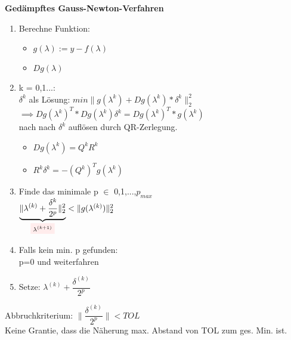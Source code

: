 \documentclass[../ZF_HM2.tex]{subfiles}
\begin{document}
\begin{mdframed}
	\textbf{Gedämpftes Gauss-Newton-Verfahren}
	\begin{enumerate}
		\item Berechne Funktion:
		\begin{itemize}
			\item  $g(\lambda):= y-f(\lambda)$
			\item $Dg(\lambda)$
			\end{itemize}
		\item k = 0,1...:\\ $\delta^{k}$ als Lösung: $min\|g(\lambda^{k})+Dg(\lambda^{k})*\delta^{k}\|_2^{2}$\\
		$\implies Dg(\lambda^{k})^{T}*Dg(\lambda^{k})\delta^{k} = Dg(\lambda^{k})^{T}*g(\lambda^{k})$\\
		nach \colorbox{pink!30}{nach $\delta^{k}$ auflösen} durch QR-Zerlegung.
		\begin{itemize}
			\item \colorbox{pink!30}{$Dg(\lambda^{k})=Q^{k}R^{k}$}
			\item \colorbox{pink!30}{$R^{k}\delta^{k}=-(Q^{k})^{T}g(\lambda^{k})$}
		\end{itemize}
		\item Finde das minimale p $\in$ {0,1,...,$p_{max}$}\\ $\underbrace{\|\lambda^{(k)}+\dfrac{\delta^{k}}{2^{p}}\|_2^{2}}_\text{\colorbox{pink!30}{$\lambda^{(k+1)}$}}<\|g(\lambda^{(k)})\|_2^{2}$\\
		\item Falls kein min. p gefunden:\\
		p=0 und weiterfahren
		\item Setze: $\lambda^{(k)}+\dfrac{\delta^{(k)}}{2^{p}}$
		
	\end{enumerate}
\end{mdframed}
\colorbox{teal!30}{Abbruchkriterium:}  $\|\dfrac{\delta^{(k)}}{2^{p}}\| < TOL$ \\Keine Grantie, dass die Näherung max. Abstand von TOL zum ges. Min. ist.
\end{document}
